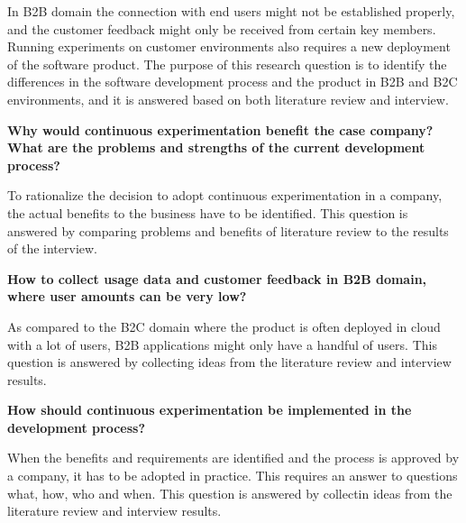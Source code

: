 \documentclass[english]{tktltiki2}
\theoremstyle{definition}
\theoremstyle{remark}
\begin{document}
\noindent In B2B domain the connection with end users might not be established properly, and the customer feedback might only be received from certain key members. Running experiments on customer environments also requires a new deployment of the software product. The purpose of this research question is to identify the differences in the software development process and the product in B2B and B2C environments, and it is answered based on both literature review and interview. \newline

\noindent \textbf{Why would continuous experimentation benefit the case company? What are the problems and strengths of the current development process?}

\noindent To rationalize the decision to adopt continuous experimentation in a company, the actual benefits to the business have to be identified. This question is answered by comparing problems and benefits of literature review to the results of the interview. \newline

\noindent \textbf{How to collect usage data and customer feedback in B2B domain, where user amounts can be very low?}

\noindent As compared to the B2C domain where the product is often deployed in cloud with a lot of users, B2B applications might only have a handful of users. This question is answered by collecting ideas from the literature review and interview results. \newline

\noindent \textbf{How should continuous experimentation be implemented in the development process?}

\noindent When the benefits and requirements are identified and the process is approved by a company, it has to be adopted in practice. This requires an answer to questions what, how, who and when. This question is answered by collectin ideas from the literature review and interview results. \newline
\end{document}
